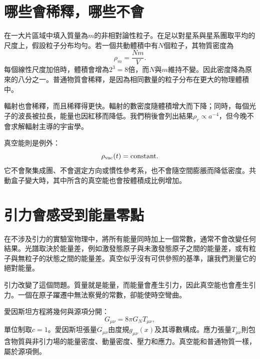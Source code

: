 \section{哪些會稀釋，哪些不會}

在一大片區域中填入質量為\(m\)的非相對論性粒子。在足以對星系與星系團取平均的尺度上，假設粒子分布均勻。若一個共動體積中有\(N\)個粒子，其物質密度為
\begin{equation}
\rho_m=\frac{Nm}{V}.
\end{equation}
每個線性尺度加倍時，體積會增為\(2^3=8\)倍，而\(N\)與\(m\)維持不變。因此密度降為原來的八分之一。普通物質會稀釋，是因為相同數量的粒子分布在更大的物理體積中。

輻射也會稀釋，而且稀釋得更快。輻射的數密度隨體積增大而下降；同時，每個光子的波長被拉長，能量也因紅移而降低。我們稍後會列出結果\(\rho_r\propto a^{-4}\)，但今晚不會求解輻射主導的宇宙學。

真空能則是例外：
\begin{equation}
\rho_{\rm vac}(t)=\text{constant}.
\label{eq:l08-rho-vac-constant}
\end{equation}
它不會聚集成團、不會選定方向或慣性參考系，也不會隨空間膨脹而降低密度。共動盒子變大時，其中所含的真空能也會按體積成比例增加。


\section{引力會感受到能量零點}

在不涉及引力的實驗室物理中，將所有能量同時加上一個常數，通常不會改變任何結果。光譜取決於能量差，例如激發態原子與未激發態原子之間的能量差，或有粒子與無粒子的狀態之間的能量差。真空似乎沒有可供參照的基準，讓我們測量它的絕對能量。

引力改變了這個問題。質量就是能量，而能量會產生引力，因此真空能也會產生引力。一個在原子躍遷中無法察覺的常數，卻能使時空彎曲。

愛因斯坦方程將幾何與源項分開：
\begin{equation}
G_{\mu\nu}=8\pi G_N T_{\mu\nu},
\label{eq:l08-einstein}
\end{equation}
單位制取\(c=1\)。愛因斯坦張量\(G_{\mu\nu}\)由度規\(g_{\mu\nu}(x)\)及其導數構成。應力張量\(T_{\mu\nu}\)則包含物質與非引力場的能量密度、動量密度、壓力和應力。真空能和普通物質一樣，屬於源項側。

